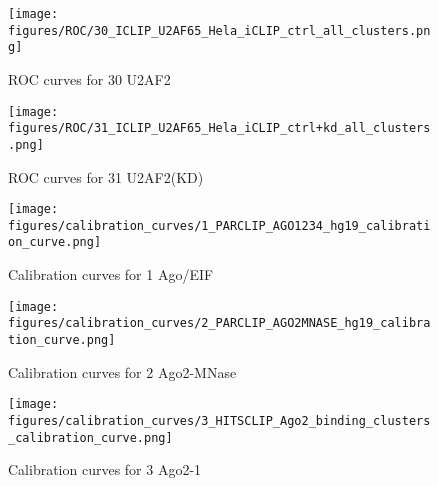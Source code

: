 \documentclass[11pt]{article}
\begin{document}
    
    
    \begin{figure}
        \begin{center}
            \texttt{[image: figures/ROC/30\_ICLIP\_U2AF65\_Hela\_iCLIP\_ctrl\_all\_clusters.png]}
            \caption{ROC curves for 30 U2AF2}
            \label{fig:ROC30 U2AF2}
        \end{center}
    \end{figure}

    
    
    \begin{figure}
        \begin{center}
            \texttt{[image: figures/ROC/31\_ICLIP\_U2AF65\_Hela\_iCLIP\_ctrl+kd\_all\_clusters.png]}
            \caption{ROC curves for 31 U2AF2(KD)}
            \label{fig:ROC31 U2AF2(KD)}
        \end{center}
    \end{figure}

    
    
    \begin{figure}
        \begin{center}
            \texttt{[image: figures/calibration\_curves/1\_PARCLIP\_AGO1234\_hg19\_calibration\_curve.png]}
            \caption{Calibration curves for 1 Ago/EIF}
            \label{fig:calibration1 Ago/EIF}
        \end{center}
    \end{figure}

    
    
    \begin{figure}
        \begin{center}
            \texttt{[image: figures/calibration\_curves/2\_PARCLIP\_AGO2MNASE\_hg19\_calibration\_curve.png]}
            \caption{Calibration curves for 2 Ago2-MNase}
            \label{fig:calibration2 Ago2-MNase}
        \end{center}
    \end{figure}

    
    
    \begin{figure}
        \begin{center}
            \texttt{[image: figures/calibration\_curves/3\_HITSCLIP\_Ago2\_binding\_clusters\_calibration\_curve.png]}
            \caption{Calibration curves for 3 Ago2-1}
            \label{fig:calibration3 Ago2-1}
        \end{center}
    \end{figure}
\end{document}
